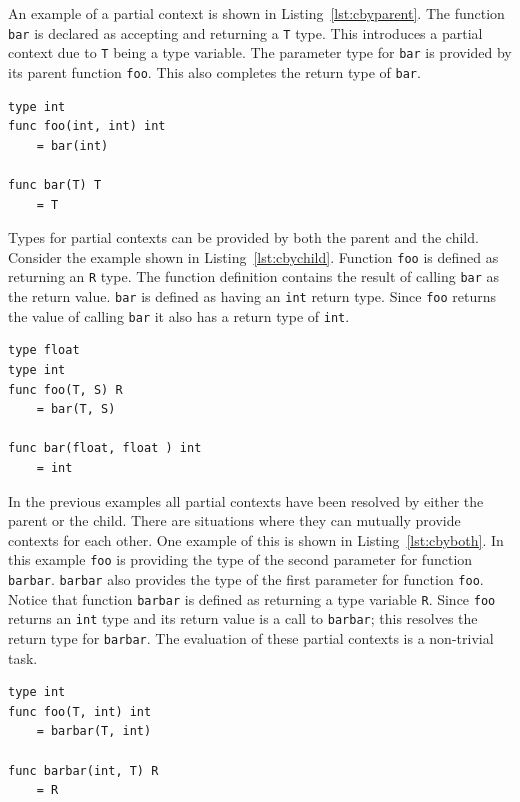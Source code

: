 \documentclass{acm_proc_article-sp}
\begin{document}
An example of a partial context is shown in Listing~\ref{lst:cbyparent}. The
function \lstinline!bar! is declared as accepting and returning a \lstinline!T!
type.  This introduces a partial context due to \lstinline!T! being a type
variable. The parameter type for \lstinline!bar! is provided by its parent
function \lstinline!foo!. This also completes the return type of
\lstinline!bar!.

\begin{lstlisting}[caption=Explicit context provided by parent,language=Paratype,label=lst:cbyparent]
type int
func foo(int, int) int
    = bar(int)

func bar(T) T
    = T
\end{lstlisting}

Types for partial contexts can be provided by both the parent and the child.
Consider the example shown in Listing~\ref{lst:cbychild}. Function
\lstinline!foo!  is defined as returning an \lstinline!R! type. The function
definition contains the result of calling \lstinline!bar! as the return value.
\lstinline!bar! is defined as having an \lstinline!int! return type. Since
\lstinline!foo! returns the value of calling \lstinline!bar! it also has a
return type of \lstinline!int!.

\begin{lstlisting}[caption=Explicit context provided by child,language=Paratype,label=lst:cbychild]
type float
type int
func foo(T, S) R
    = bar(T, S)

func bar(float, float ) int
    = int
\end{lstlisting}

In the previous examples all partial contexts have been resolved by either the
parent or the child. There are situations where they can mutually provide
contexts for each other. One example of this is shown in
Listing~\ref{lst:cbyboth}. In this example \lstinline!foo! is providing
the type of the second parameter for function \lstinline!barbar!.
\lstinline!barbar!  also provides the type of the first parameter for function
\lstinline!foo!. Notice that function \lstinline!barbar! is defined as
returning a type variable \lstinline!R!. Since \lstinline!foo! returns an
\lstinline!int! type and its return value is a call to \lstinline!barbar!; this
resolves the return type for \lstinline!barbar!. The evaluation of these
partial contexts is a non-trivial task.

\begin{lstlisting}[caption=Explicit context provided by child and parent,language=Paratype,label=lst:cbyboth]
type int
func foo(T, int) int
    = barbar(T, int)

func barbar(int, T) R
    = R
\end{lstlisting}
\end{document}
